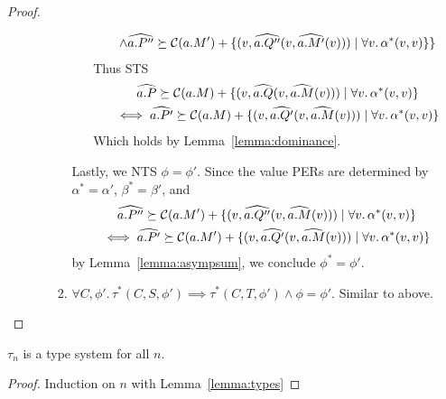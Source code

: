 \begin{proof}
\begin{enumerate}
\begin{itemize}
\begin{enumerate}
\begin{itemize}
\begin{gather*}
        \land\widehat{a.P''} \succeq \mathcal{C}(a.M') + \{(v, \widehat{a.Q''}(v,\widehat{a.M'}(v))) \mid \forall v.\, \alpha^*(v,v)\}\} 
      \end{gather*}
          Thus STS
          \begin{gather*}
            \widehat{a.P} \succeq \mathcal{C}(a.M) + \{(v, \widehat{a.Q}(v,\widehat{a.M}(v))) \mid \forall v.\, \alpha^*(v,v)\}\\
          \iff \widehat{a.P'} \succeq \mathcal{C}(a.M) + \{(v, \widehat{a.Q'}(v,\widehat{a.M}(v))) \mid \forall v.\, \alpha^*(v,v)\} 
          \end{gather*}
          Which holds by Lemma~\ref{lemma:dominance}.
      \end{itemize}
      Lastly, we NTS $\phi = \phi'$. Since the value PERs are determined by $\alpha^* = \alpha'$, $\beta^* = \beta'$, 
      and 
          \begin{gather*}
            \widehat{a.P''} \succeq \mathcal{C}(a.M') + \{(v, \widehat{a.Q''}(v,\widehat{a.M}(v))) \mid \forall v.\, \alpha^*(v,v)\}\\
          \iff \widehat{a.P'} \succeq \mathcal{C}(a.M') + \{(v, \widehat{a.Q'}(v,\widehat{a.M}(v))) \mid \forall v.\, \alpha^*(v,v)\} 
          \end{gather*}
          by Lemma~\ref{lemma:asympsum},
      we conclude $\phi^* = \phi'$.
  \item $\forall C,\phi'.\, \tau^*(C,S,\phi') \implies \tau^*(C,T,\phi') \land \phi = \phi'$. Similar to above.
  \end{enumerate}

\end{itemize}
\end{enumerate}
\end{proof}

\fi

\begin{lemma}
$\tau_n$ is a type system for all $n$.
\end{lemma}

\begin{proof}
  Induction on $n$ with Lemma~\ref{lemma:types}
\end{proof}
